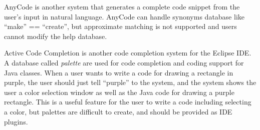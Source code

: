 \documentclass[manuscript,screen,review]{acmart}
\begin{document}

AnyCode\cite{Gvero:2015:SJE:2814270.2814295} is another system
that generates a complete code snippet from the user's
input in natural language.
AnyCode can handle synonyms database like ``make'' == ``create'',
but approximate matching is not supported and
users cannot modify the help database.



Active Code Completion\cite{Omar:2012:ACC:2337223.2337324}
is another code completion system for the Eclipse IDE.
A database called \textit{palette} are used for code completion and coding support
for Java classes.
When a user wants to write a code for drawing a rectangle in purple,
the user should just tell ``purple'' to the system,
and the system shows the user a color selection window
as well as the Java code for drawing a purple rectangle.
This is a useful feature for the user to write a code including selecting
a color, but palettes are difficult to create, and should be provided
as IDE plugins.
\end{document}
